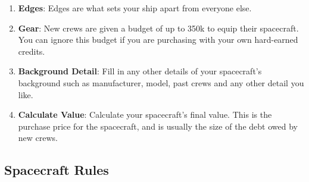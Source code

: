 \begin{multicols}{2}
\begin{enumerate}
  \begin{itemize}
      \item For 2 points you can gain another attribute point or choose an \textbf{Edge}
      \item For 1 point you can gain another systems point
  \end{itemize}

  \item \textbf{Edges}: Edges are what sets your ship apart from everyone else.

  \item \textbf{Gear}: New crews are given a budget of up to 350k to equip their spacecraft. You can ignore this budget if you are purchasing with your own hard-earned credits.

  \item \textbf{Background Detail}: Fill in any other details of your spacecraft's background such as manufacturer, model, past crews and any other detail you like.
  
  \item \textbf{Calculate Value}: Calculate your spacecraft's final value. This is the purchase price for the spacecraft, and is usually the size of the debt owed by new crews.

\end{enumerate}

\subsection{Spacecraft Rules}


\end{multicols}
